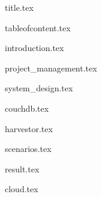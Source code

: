 \documentclass[a4paper, 11pt]{article}
\begin{document}
\thispagestyle{empty}
\thispagestyle{empty}

{title.tex}

{tableofcontent.tex}

\setcounter{page}{1}

{introduction.tex}

{project_management.tex}

{system_design.tex}

{couchdb.tex}

{harvestor.tex}

{scenarios.tex}

{result.tex}

{cloud.tex}

 
\newpage
\printbibliography
 
\end{document}
